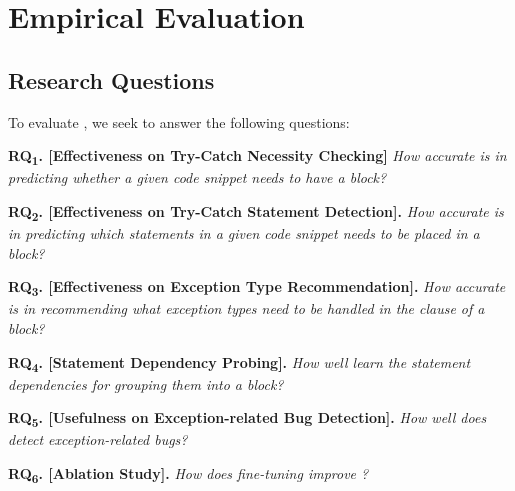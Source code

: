 \vspace{-8pt}
\section{Empirical Evaluation}
\label{sec:eval}

\subsection{Research Questions}

To evaluate {\tool}, we seek to answer the following questions:

\vspace{2pt}

\noindent \textbf{RQ\textsubscript{1}. [Effectiveness on Try-Catch
    Necessity Checking]} {\em How accurate is {\tool} in predicting
  whether a given code snippet needs to have a 
  block?}
    


\vspace{2pt}
\noindent \textbf{RQ\textsubscript{2}. [Effectiveness on Try-Catch
    Statement Detection].} {\em How accurate is {\tool} in predicting
  which statements in a given code snippet needs to be placed in a
   block?}


\vspace{2pt}
\noindent \textbf{RQ\textsubscript{3}. [Effectiveness on Exception Type Recommendation].}
{\em How accurate is {\tool} in recommending what exception types need to be handled in the  clause of a  block?}

\vspace{2pt}
\noindent \textbf{RQ\textsubscript{4}. [Statement Dependency Probing].}
{\em How well {\tool} learn the statement dependencies for grouping them into a  block?}

\vspace{2pt}
\noindent \textbf{RQ\textsubscript{5}. [Usefulness on
    Exception-related Bug Detection].}  {\em How well does {\tool}
  detect exception-related bugs?}

\vspace{2pt}
\noindent \textbf{RQ\textsubscript{6}. [Ablation Study].} {\em How does
 fine-tuning improve {\tool}?}




